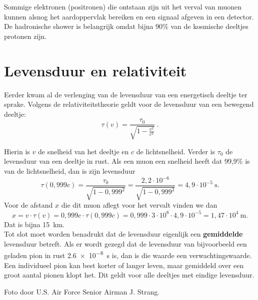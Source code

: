 Sommige elektronen (positronen) die ontstaan zijn uit het verval van
muonen kunnen alsnog het aardoppervlak bereiken en een signaal afgeven
in een \hisparc detector.
\\

De hadronische shower is belangrijk omdat bijna 90\% van de kosmische
deeltjes protonen zijn.
 

\section{Levensduur en relativiteit}

Eerder kwam al de verlenging van de levensduur van een energetisch
deeltje ter sprake. Volgens de relativiteitstheorie geldt voor de
levensduur van een bewegend deeltje:
\begin{equation}
    \tau (v) = \frac{\tau_0}{\sqrt{1-\frac{v^2}{c^2}}} \ . \nonumber
\end{equation}

Hierin is $v$ de snelheid van het deeltje en $c$ de lichtsnelheid.
Verder is $\tau_0$ de levensduur van een deeltje in rust. Als een muon
een snelheid heeft dat 99,9\% is van de lichtsnelheid, dan is zijn
levensduur 
\begin{equation}
    \tau(0,999c) = \frac{\tau_0}{\sqrt{1-0,999^2}}
    = \frac{2,2 \cdot 10^{-6}}{\sqrt{1-0,999^2}}
    = 4,9 \cdot 10^{-5} \SI{}{\second}. \nonumber
\end{equation}
Voor de afstand $x$ die dit muon aflegt voor het vervalt vinden we dan 
\begin{equation}
    x = v \cdot \tau (v)
    = 0,999c \cdot \tau (0,999c)
    = 0,999 \cdot 3 \cdot 10^8 \cdot 4,9 \cdot 10^{-5}
    = 1,47 \cdot 10^4 \SI{}{\meter}. \nonumber
\end{equation}
Dat is bijna \SI{15}{\km}. 
\\

Tot slot moet worden benadrukt dat de levensduur eigenlijk een
\textbf{gemiddelde} levensduur betreft. Als er wordt gezegd dat de
levensduur van bijvoorbeeld een geladen pion in rust
\SI{2,6e-8}{\second} is, dan is die waarde een verwachtingswaarde. Een
individueel pion kan best korter of langer leven, maar gemiddeld over
een groot aantal pionen klopt het. Dit geldt voor alle deeltjes met
eindige levensduur.


\begin{thebibliography}{9}
     Foto door U.S. Air Force Senior Airman J. Strang.
\end{thebibliography}



